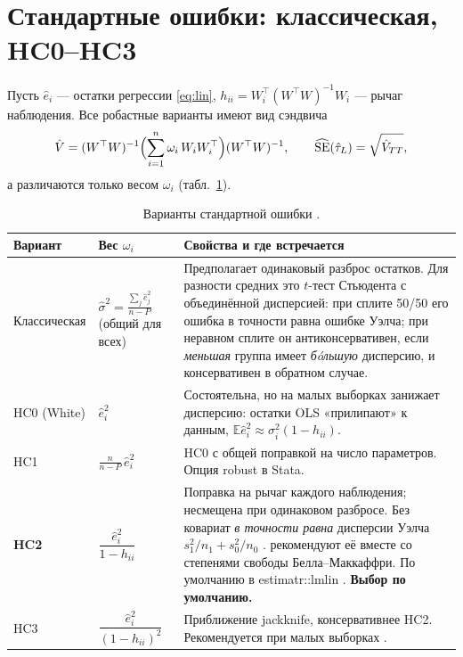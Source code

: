 \documentclass[10pt,a4paper]{article}
\newcommand{\E}{\mathbb{E}}
\newcommand{\SE}{\operatorname{SE}}
\newcommand{\T}{^{\top}}
\newcommand{\codeus}{\textunderscore\allowbreak}
\newcommand{\code}[1]{{\small\ttfamily\let\_\codeus #1}}
\begin{document}
\section{Стандартные ошибки: классическая, HC0--HC3}\label{sec:se}

Пусть $\hat e_i$ --- остатки регрессии \eqref{eq:lin}, $h_{ii}=W_i\T(W\T W)^{-1}W_i$ --- рычаг наблюдения.
Все робастные варианты имеют вид сэндвича
\begin{equation}\label{eq:hc}
\hat V=(W\T W)^{-1}\Bigl(\sum_{i=1}^n \omega_i\,W_iW_i\T\Bigr)(W\T W)^{-1},\qquad
\widehat{\SE}(\hat\tau_L)=\sqrt{\hat V_{TT}},
\end{equation}
а различаются только весом $\omega_i$ (табл.~\ref{tab:hc}).

\begin{table}[H]
\centering\small
\caption{Варианты стандартной ошибки \citep{mackinnonwhite1985, longervin2000}.}\label{tab:hc}
\begin{tabularx}{\textwidth}{@{}l>{\centering\arraybackslash}p{3.0cm}X@{}}
\toprule
Вариант & Вес $\omega_i$ & Свойства и где встречается \\
\midrule
Классическая & $\hat\sigma^2=\frac{\sum_j\hat e_j^2}{n-P}$ (общий для всех) & Предполагает одинаковый разброс остатков. Для разности средних это $t$-тест Стьюдента с объединённой дисперсией: при сплите 50/50 его ошибка в точности равна ошибке Уэлча; при неравном сплите он антиконсервативен, если \emph{меньшая} группа имеет \emph{бóльшую} дисперсию, и консервативен в обратном случае. \\
HC0 (White) & $\hat e_i^2$ & Состоятельна, но на малых выборках занижает дисперсию: остатки OLS «прилипают» к данным, $\E\hat e_i^2\approx\sigma_i^2(1-h_{ii})$. \\
HC1 & $\frac{n}{n-P}\,\hat e_i^2$ & HC0 с общей поправкой на число параметров. Опция \code{robust} в Stata. \\
\textbf{HC2} & $\dfrac{\hat e_i^2}{1-h_{ii}}$ & Поправка на рычаг каждого наблюдения; несмещена при одинаковом разбросе. Без ковариат \emph{в точности равна} дисперсии Уэлча $s_1^2/n_1+s_0^2/n_0$ \citep{samiiaronow2012}. \citet{imbenskolesar2016} рекомендуют её вместе со степенями свободы Белла--Маккаффри. По умолчанию в \code{estimatr::lm\_lin} \citep{estimatr}. \textbf{Выбор по умолчанию.} \\
HC3 & $\dfrac{\hat e_i^2}{(1-h_{ii})^2}$ & Приближение jackknife, консервативнее HC2. Рекомендуется при малых выборках \citep{longervin2000}. \\
\bottomrule
\end{tabularx}
\end{table}
\end{document}
